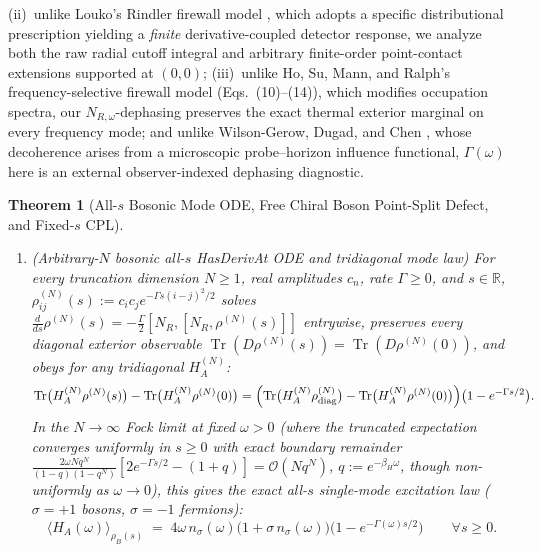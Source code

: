 \documentclass[11pt,a4paper]{article}
\newtheorem{theorem}{Theorem}
\theoremstyle{definition}
\theoremstyle{remark}
\newcommand{\Tr}{\operatorname{Tr}}
\newcommand{\bbR}{\mathbb{R}}
\newcommand{\1}{\mathbf{1}}
\newcommand{\code}[1]{{\scriptsize\ttfamily #1}}
\begin{document}
(ii)~unlike Louko's Rindler firewall model \cite{Louko2014}, which adopts a specific distributional prescription yielding a \emph{finite} derivative-coupled detector response, we analyze both the raw radial cutoff integral and arbitrary finite-order point-contact extensions supported at $(0,0)$;
(iii)~unlike Ho, Su, Mann, and Ralph's frequency-selective firewall model \cite{Ho2016} (Eqs.~(10)--(14)), which modifies occupation spectra, our $N_{R,\omega}$-dephasing preserves the exact thermal exterior marginal on every frequency mode; and unlike Wilson-Gerow, Dugad, and Chen \cite{WilsonGerow2024}, whose decoherence arises from a microscopic probe--horizon influence functional, $\Gamma(\omega)$ here is an external observer-indexed dephasing diagnostic.

\begin{theorem}[All-$s$ Bosonic Mode ODE, Free Chiral Boson Point-Split Defect, and Fixed-$s$ CPL]\label{thm:hadamard}
\leavevmode
\begin{enumerate}
  \item[(a)] \emph{(Arbitrary-$N$ bosonic all-$s$ \code{HasDerivAt} ODE and tridiagonal mode law)} For every truncation dimension $N\ge 1$, real amplitudes $c_n$, rate $\Gamma\ge 0$, and $s\in\bbR$, $\rho^{(N)}_{ij}(s) := c_i c_j e^{-\Gamma s(i-j)^2/2}$ \cite{SperlingVogel2012} solves $\frac{d}{ds}\rho^{(N)}(s) = -\frac{\Gamma}{2}[N_R,[N_R,\rho^{(N)}(s)]]$ entrywise, preserves every diagonal exterior observable $\Tr(D\rho^{(N)}(s)) = \Tr(D\rho^{(N)}(0))$, and obeys for any tridiagonal $H_A^{(N)}$:
  \begin{equation}\label{eq:tridiag-all-s}
    \Tr\bigl(H_A^{(N)}\rho^{(N)}(s)\bigr) - \Tr\bigl(H_A^{(N)}\rho^{(N)}(0)\bigr)
    = \Bigl(\Tr\bigl(H_A^{(N)}\rho^{(N)}_{\mathrm{diag}}\bigr) - \Tr\bigl(H_A^{(N)}\rho^{(N)}(0)\bigr)\Bigr)\bigl(1 - e^{-\Gamma s/2}\bigr).
  \end{equation}
  In the $N\to\infty$ Fock limit at fixed $\omega > 0$ (where the truncated expectation converges uniformly in $s\ge 0$ with exact boundary remainder $\frac{2\omega N q^N}{(1-q)(1-q^N)}[2e^{-\Gamma s/2}-(1+q)] = \mathcal{O}(N q^N)$, $q:=e^{-\beta_H\omega}$, though non-uniformly as $\omega\to 0$), this gives the exact all-$s$ single-mode excitation law ($\sigma=+1$ bosons, $\sigma=-1$ fermions):
  \begin{equation}\label{eq:unified-all-s}
    \langle H_A(\omega)\rangle_{\rho_B(s)} \;=\; 4\omega\,n_\sigma(\omega)\bigl(1 + \sigma\,n_\sigma(\omega)\bigr)\bigl(1 - e^{-\Gamma(\omega) s/2}\bigr) \qquad \forall s \ge 0.
  \end{equation}

\end{enumerate}
\end{theorem}
\end{document}
